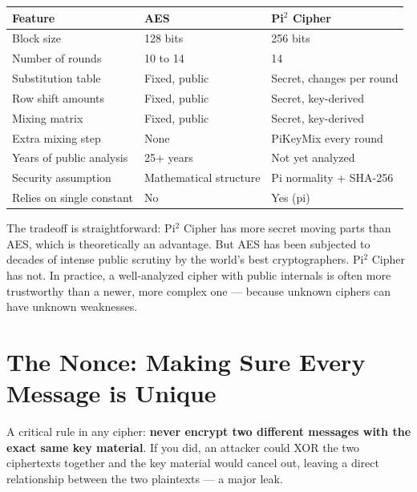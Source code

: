\documentclass[12pt, a4paper]{article}
\begin{document}
\begin{center}
\renewcommand{\arraystretch}{1.5}
\begin{tabular}{p{5cm}p{3.8cm}p{3.8cm}}
\toprule
\textbf{Feature} & \textbf{AES} & \textbf{Pi$^2$ Cipher} \\
\midrule
Block size & 128 bits & 256 bits \\
Number of rounds & 10 to 14 & 14 \\
Substitution table & Fixed, public & Secret, changes per round \\
Row shift amounts & Fixed, public & Secret, key-derived \\
Mixing matrix & Fixed, public & Secret, key-derived \\
Extra mixing step & None & PiKeyMix every round \\
Years of public analysis & 25+ years & Not yet analyzed \\
Security assumption & Mathematical structure & Pi normality + SHA-256 \\
Relies on single constant & No & Yes (pi) \\
\bottomrule
\end{tabular}
\end{center}

\vspace{0.5em}

The tradeoff is straightforward: Pi$^2$ Cipher has more secret moving parts than AES, which is theoretically an advantage. But AES has been subjected to decades of intense public scrutiny by the world's best cryptographers. Pi$^2$ Cipher has not. In practice, a well-analyzed cipher with public internals is often more trustworthy than a newer, more complex one --- because unknown ciphers can have unknown weaknesses.

\section{The Nonce: Making Sure Every Message is Unique}

\vspace{0.5em}

A critical rule in any cipher: \textbf{never encrypt two different messages with the exact same key material}. If you did, an attacker could XOR the two ciphertexts together and the key material would cancel out, leaving a direct relationship between the two plaintexts --- a major leak.
\end{document}
